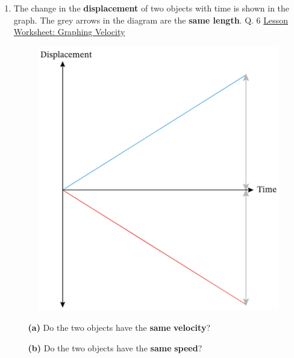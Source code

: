 \documentclass[A4,12pt]{article}
\begin{document}
\begin{enumerate}[label=\bfseries (\arabic*)]
\item The change in the \textbf{displacement} of two objects with time is shown in the graph. The grey arrows in the diagram are the \textbf{same length}. \cite{Nagwa} Q. 6 \href{https://www.nagwa.com/en/worksheets/715142164735/}{Lesson Worksheet: Graphing Velocity}
%
\begin{figure}[H]
    \centering
    \includegraphics[scale=0.7]{Nagwa_Q6_disp.png}
\end{figure}
%
\begin{itemize}
    \item[\bf (a)] Do the two objects have the \textbf{same} \textbf{velocity}?
    
    
    
    \item[\bf (b)] Do the two objects have the \textbf{same} \textbf{speed}?
    

\end{itemize}
\end{enumerate}
\end{document}
